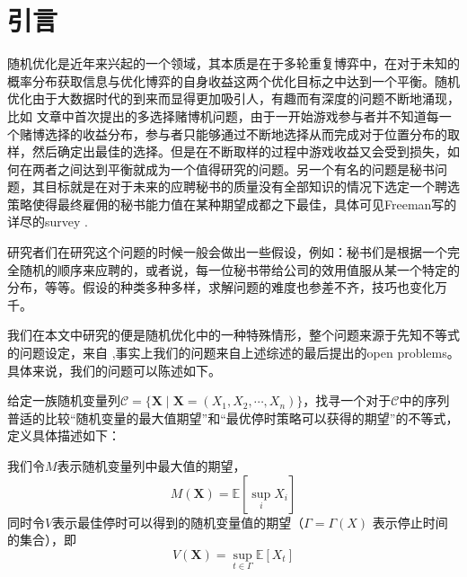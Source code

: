 \documentclass[bachelor]{thuthesis}
\begin{document}
\graphicspath{{figures/}}


\frontmatter

\makecover

\tableofcontents

%


\mainmatter



\chapter{引言}
\label{cha:intro}


随机优化是近年来兴起的一个领域，其本质是在于多轮重复博弈中，在对于未知的概率分布获取信息与优化博弈的自身收益这两个优化目标之中达到一个平衡。随机优化由于大数据时代的到来而显得更加吸引人，有趣而有深度的问题不断地涌现，比如
\cite{bandit}
文章中首次提出的多选择赌博机问题，由于一开始游戏参与者并不知道每一个赌博选择的收益分布，参与者只能够通过不断地选择从而完成对于位置分布的取样，然后确定出最佳的选择。但是在不断取样的过程中游戏收益又会受到损失，如何在两者之间达到平衡就成为一个值得研究的问题。另一个有名的问题是秘书问题，其目标就是在对于未来的应聘秘书的质量没有全部知识的情况下选定一个聘选策略使得最终雇佣的秘书能力值在某种期望成都之下最佳，具体可见Freeman写的详尽的survey
\cite{secretary}.

研究者们在研究这个问题的时候一般会做出一些假设，例如：秘书们是根据一个完全随机的顺序来应聘的，或者说，每一位秘书带给公司的效用值服从某一个特定的分布，等等。假设的种类多种多样，求解问题的难度也参差不齐，技巧也变化万千。

我们在本文中研究的便是随机优化中的一种特殊情形，整个问题来源于先知不等式的问题设定，来自
\cite{prophet}
,事实上我们的问题来自上述综述的最后提出的open problems。具体来说，我们的问题可以陈述如下。

给定一族随机变量列$\mathcal{C}=\{\textbf{X}\mid\textbf{X}=(X_1,X_2,\cdots,X_n)\}$，找寻一个对于$\mathcal{C}$中的序列普适的比较``随机变量的最大值期望''和``最优停时策略可以获得的期望''的不等式，定义具体描述如下：

我们令$M$表示随机变量列中最大值的期望，
\begin{equation}
M(\textbf{X})=\mathbb{E}[\sup_i X_i]
\end{equation}
同时令$V$表示最佳停时可以得到的随机变量值的期望（$\Gamma=\Gamma(X)$ 表示停止时间的集合），即
\begin{equation}
V(\textbf{X})=\sup_{t\in \Gamma}\mathbb{E}[X_t]
\end{equation}
\end{document}
